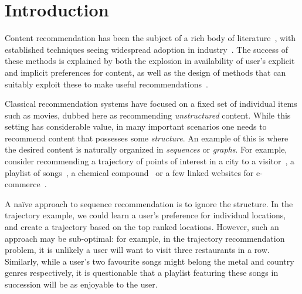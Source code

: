 
\section{Introduction}
\label{sec:intro}

Content recommendation has been the subject of a rich body of literature~\citep{Goldberg:1992,Sarwar:2001,Koren:2010},
with established techniques seeing widespread adoption in industry~\citep{Linden:2003,Agarwal:2013,Amatriain:2015,Gomez-Uribe:2015}.
The success of these methods is explained by both the explosion in availability of user's explicit and implicit preferences for content,
as well as the design of methods that can suitably exploit these to make useful recommendations~\citep{Koren:2009}.

Classical recommendation systems have focused on a fixed set of individual items such as movies, dubbed here as recommending \emph{unstructured} content.
While this setting has considerable value,
in many important scenarios one needs to recommend content that possesses some \emph{structure}.
An example of this is where the desired content is naturally organized in
\emph{sequences} or {\em graphs}.
For example, consider %
recommending a trajectory of points of interest in a city to a visitor~\citep{lu2010photo2trip,lu2012personalized,ijcai15,cikm16paper}, a playlist of songs~\citep{McFee:2011,chen2012playlist,hidasi2015session,choi2016towards},
a chemical compound~\cite{dehaspe1998finding} or a few linked websites for e-commerce~\cite{antikacioglu2015recommendation}.
%

A na\"{i}ve approach to sequence recommendation is to ignore the structure.
In the trajectory example, we could learn a user's preference for individual locations,
and create a trajectory based on the top ranked locations.
However, such an approach may be sub-optimal:
for example,
in the trajectory recommendation problem, it is unlikely a user will want to visit three restaurants in a row.
Similarly,
while a user's two favourite songs might belong
the metal and country genres respectively,
it is questionable that a playlist featuring these songs in succession will be as enjoyable to the user.

